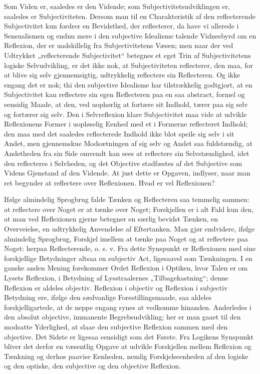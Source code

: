 \documentclass[11pt]{book}
\newcommand{\opage}[1]{\marginnote{\footnotesize\textit{[#1]}}}
\begin{document}
\opage{54} \setcounter{footnote}{0}%
Som Viden er, saaledes er den Vidende; som Subjectivitetsudviklingen er,
saaledes er Subjectiviteten. Dersom man til en Charakteristik af den
reflecterende Subjectivitet kun fordrer en Bevidsthed, der reflecterer, da
have vi allerede i Sensualismen og endnu mere i den subjective Idealisme
talende Vidnesbyrd om en Reflexion, der er uadskillelig fra
Subjectivitetens Væsen; men naar der ved Udtrykket „reflecterende
Subjectivitet“ betegnes et eget Trin af Subjectivitetens logiske
Selvudvikling, er det ikke nok, at Subjectiviteten reflecterer, den maa,
for at blive sig selv gjennemsigtig, udtrykkelig reflectere sin
Reflecteren. Og ikke engang det er nok; thi den subjective Idealisme har
tilstrækkelig godtgjort, at en Subjectivitet kan reflectere sin egen
Reflecteren paa en saa abstract, formel og eensidig Maade, at den, ved
uophørlig at fortære sit Indhold, tærer paa sig selv og fortærer sig selv.
Den i Selvreflexion klare Subjectivitet maa vide at udvikle Reflexionens
Former i uopløselig Eenhed med et i Formerne reflecteret Indhold; den maa
med det saaledes reflecterede Indhold ikke blot speile sig selv i sit
Andet, men gjennemskue Modsætningen af sig selv og Andet saa fuldstændig,
at Andetheden fra sin Side omvendt kan sees at reflectere sin
Selvstændighed, idet den reflecteres i Selvheden, og det Objective
stadfæstes af det Subjective som Videns Gjenstand af den Vidende. At just
dette er Opgaven, indlyser, naar man ret begynder at reflectere over
Reflexionen. Hvad er vel Reflexionen?

Ifølge almindelig Sprogbrug falde Tænken og Reflecteren saa temmelig
sammen: at reflectere over Noget er at tænke over Noget; Forskjellen er i
alt Fald kun den, at man ved Reflexionen gjerne betegner en særlig bevidst
Tænken, en Overveielse, en udtrykkelig Anvendelse af Eftertanken. Man gjør
endvidere, ifølge almindelig Sprogbrug, Forskjel imellem
\opage{55} \setcounter{footnote}{0}%
at tænke paa Noget og at reflectere paa Noget: herpaa Reflecterende,
o. s. v. Fra dette Synspunkt er Reflexionen med sine forskjellige
Betydninger altsaa en subjectiv Act, ligesaavel som Tænkningen. I en ganske
anden Mening forekommer Ordet Reflexion i Optiken, hvor Talen er om Lysets
Reflexion, i Betydning af Lysstraalernes „Tilbagekastning“; denne Reflexion
er aldeles objectiv. Reflexion i objectiv og Reflexion i subjectiv
Betydning ere, ifølge den sædvanlige Forestillingsmaade, saa aldeles
forskjelligartede, at de neppe engang synes at vedkomme hinanden.
Anderledes i den absolut objective, immanente Begrebsudvikling; her er man
gaaet til den modsatte Yderlighed, at slaae den subjective Reflexion sammen
med den objective. Det Sidste er ligesaa eensidigt som det Første. Fra
Logikens Synspunkt bliver det derfor en væsentlig Opgave at udvikle
Forskjellen mellem Reflexion og Tænkning og derhos paavise Eenheden, nemlig
Forskjelseenheden af den logiske og den optiske, den subjective og den
objective Reflexion.
\end{document}
